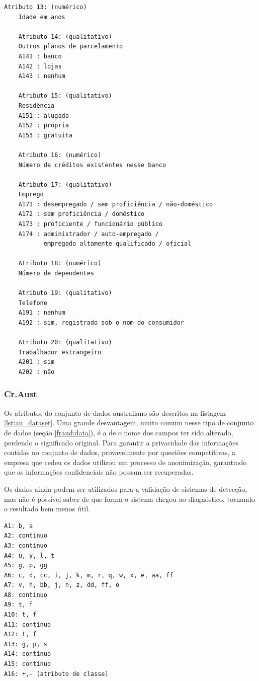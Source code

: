 \begin{lstlisting}[caption=Atributos do conjunto de dados alemão,label=lst:ge_dataset]
    Atributo 13: (numérico)
    Idade em anos

    Atributo 14: (qualitativo)
    Outros planos de parcelamento
    A141 : banco
    A142 : lojas
    A143 : nenhum

    Atributo 15: (qualitativo)
    Residência
    A151 : alugada
    A152 : própria
    A153 : gratuita

    Atributo 16: (numérico)
    Número de créditos existentes nesse banco

    Atributo 17: (qualitativo)
    Emprego
    A171 : desempregado / sem proficiência / não-doméstico
    A172 : sem proficiência / doméstico
    A173 : proficiente / funcionário público
    A174 : administrador / auto-empregado /
           empregado altamente qualificado / oficial

    Atributo 18: (numérico)
    Número de dependentes

    Atributo 19: (qualitativo)
    Telefone
    A191 : nenhum
    A192 : sim, registrado sob o nom do consumidor

    Atributo 20: (qualitativo)
    Trabalhador estrangeiro
    A201 : sim
    A202 : não
\end{lstlisting}

\subsubsection{Cr.Aust}

Os atributos do conjunto de dados australiano são descritos na listagem \ref{lst:au_dataset}. Uma grande desvantagem, muito comum nesse tipo de conjunto de dados (seção \ref{fraud:data}), é a de o nome dos campos ter sido alterado, perdendo o significado original. Para garantir a privacidade das informações contidas no conjunto de dados, provavelmente por questões competitivas, a empresa que cedeu os dados utilizou um processo de anonimização, garantindo que as informações confidenciais não possam ser recuperadas.

Os dados ainda podem ser utilizados para a validação de sistemas de detecção, mas não é possível saber de que forma o sistema chegou ao diagnóstico, tornando o resultado bem menos útil.

\vspace{1cm}
\begin{lstlisting}[caption=Atributos do conjunto de dados australiano ,label=lst:au_dataset]
A1: b, a
A2: contínuo
A3: contínuo
A4: u, y, l, t
A5: g, p, gg
A6: c, d, cc, i, j, k, m, r, q, w, x, e, aa, ff
A7: v, h, bb, j, n, z, dd, ff, o
A8: contínuo
A9: t, f
A10: t, f
A11: contínuo
A12: t, f
A13: g, p, s
A14: contínuo
A15: contínuo
A16: +,- (atributo de classe)
\end{lstlisting}

